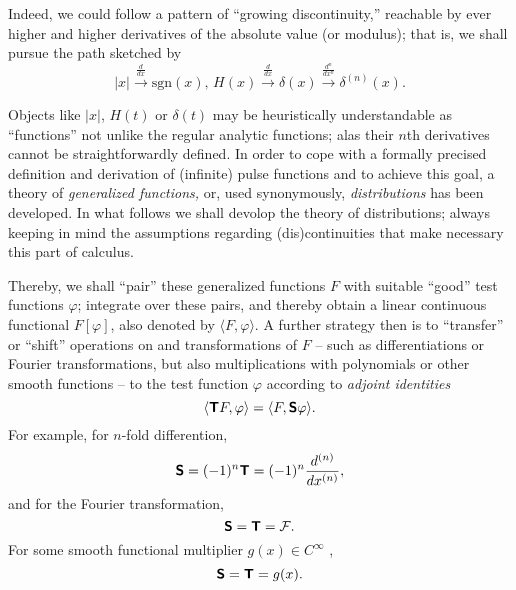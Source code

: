 
Indeed, we could follow a pattern of ``growing discontinuity,''
reachable by ever higher and higher derivatives of the
absolute value (or modulus); that is, we shall pursue the path sketched by
$$
\vert x\vert
\stackrel{\frac{d}{dx}  }{  \longrightarrow}
\textrm{sgn}(x) ,\,
H(x)
\stackrel{\frac{d}{dx} }{ \longrightarrow}
\delta (x)
\stackrel{\frac{d^n}{dx^n} }{ \longrightarrow}
\delta^{(n)} (x)
.
$$



Objects like $\vert x\vert$,  $H(t)$ or $\delta (t)$ may be heuristically understandable
as ``functions'' not unlike
the regular analytic functions; alas
their $n$th derivatives cannot be straightforwardly defined.
In order to cope with a formally precised definition
and derivation of (infinite) pulse functions and to achieve this goal,
a theory of  {\em  generalized functions,}
or, used synonymously,
{\em distributions}
has been developed.
In what follows we shall
devolop the theory of distributions;
always keeping in mind the assumptions
regarding (dis)continuities
that make necessary this part of calculus.

Thereby, we shall ``pair'' these generalized functions $F$ with suitable ``good''
test functions $\varphi$;
integrate over these pairs, and thereby obtain a linear continuous functional
$F[\varphi]$,
also denoted by
$\langle F, \varphi \rangle $.
A further strategy
then is to ``transfer'' or ``shift'' operations on and transformations of $F$
-- such as differentiations or Fourier transformations, but also multiplications with polynomials or other smooth functions --
to the test function $\varphi$ according to
{\em adjoint identities}
\begin{equation}
\langle \textsf{\textbf{T}} F, \varphi \rangle
=
\langle F, \textsf{\textbf{S}} \varphi \rangle.
\end{equation}
For example,
for $n$-fold differention,
\begin{equation}
\textsf{\textbf{S}} = (-1)^n \textsf{\textbf{T}} = (-1)^n \frac{d^{(n)}}{dx^{(n)}},
\end{equation}
and for the Fourier transformation,
\begin{equation}
\textsf{\textbf{S}} =   \textsf{\textbf{T}} = {\cal F} .
\end{equation}
For some smooth functional multiplier $g(x)\in C^\infty$ ,
\begin{equation}
\textsf{\textbf{S}} =   \textsf{\textbf{T}} = g(x) .
\end{equation}


